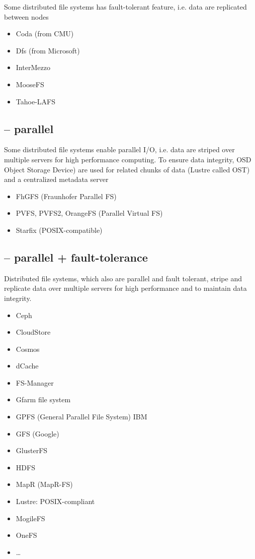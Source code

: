Some distributed file systems has fault-tolerant feature, i.e. data are
replicated between nodes 
\begin{itemize}
  \item Coda (from CMU)
  \item Dfs (from Microsoft)
  \item InterMezzo
  \item MooseFS 
  \item Tahoe-LAFS
\end{itemize}

\subsection{-- parallel}

Some distributed file systems enable parallel I/O, i.e. data are striped over
multiple servers for high performance computing. To ensure data integrity, OSD
Object Storage Device) are used for related chunks of data (Lustre called OST)
and a centralized metadata server
\begin{itemize}
  \item FhGFS (Fraunhofer Parallel FS)
  \item PVFS, PVFS2, OrangeFS (Parallel Virtual FS)
  \item Starfix (POSIX-compatible)
\end{itemize} 

\subsection{-- parallel + fault-tolerance}	

Distributed file systems, which also are parallel and fault tolerant, stripe and
replicate data over multiple servers for high performance and to maintain data
integrity.  
\begin{itemize}
  \item Ceph
  \item CloudStore
  \item Cosmos
  \item dCache
  \item FS-Manager
  \item Gfarm file system
  \item GPFS (General Parallel File System) IBM
  \item GFS (Google)
  \item GlusterFS 
  \item HDFS
  \item MapR (MapR-FS)
  \item Lustre: POSIX-compliant
  \item MogileFS
  \item OneFS
  \item \ldots
\end{itemize}
 
